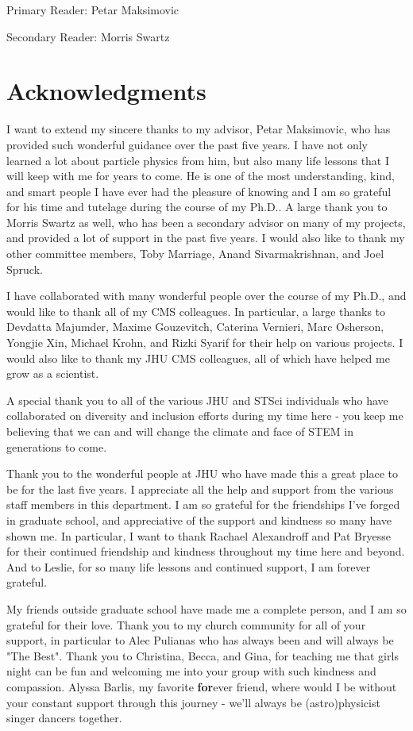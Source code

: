 \documentclass[12pt]{report}
\begin{document}
\vspace{15mm}

\noindent Primary Reader: Petar Maksimovic

\noindent Secondary Reader: Morris Swartz

\chapter*{Acknowledgments}
I want to extend my sincere thanks to my advisor, Petar Maksimovic, who has provided such wonderful guidance over the past five years. I have not only learned a lot about particle physics from him, but also many life lessons that I will keep with me for years to come. He is one of the most understanding, kind, and smart people I have ever had the pleasure of knowing and I am so grateful for his time and tutelage during the course of my Ph.D.. A large thank you to Morris Swartz as well, who has been a secondary advisor on many of my projects, and provided a lot of support in the past five years. I would also like to thank my other committee members, Toby Marriage, Anand Sivarmakrishnan, and Joel Spruck.

I have collaborated with many wonderful people over the course of my Ph.D., and would like to thank all of my CMS colleagues. In particular, a large thanks to Devdatta Majumder, Maxime Gouzevitch, Caterina Vernieri, Marc Osherson, Yongjie Xin, Michael Krohn, and Rizki Syarif for their help on various projects. I would also like to thank my JHU CMS colleagues, all of which have helped me grow as a scientist.

A special thank you to all of the various JHU and STSci individuals who have collaborated on diversity and inclusion efforts during my time here - you keep me believing that we can and will change the climate and face of STEM in generations to come.

Thank you to the wonderful people at JHU who have made this a great place to be for the last five years. I appreciate all the help and support from the various staff members in this department. I am so grateful for the friendships I've forged in graduate school, and appreciative of the support and kindness so many have shown me. In particular, I want to thank Rachael Alexandroff and Pat Bryesse for their continued friendship and kindness throughout my time here and beyond. And to Leslie, for so many life lessons and continued support, I am forever grateful.

My friends outside graduate school have made me a complete person, and I am so grateful for their love. Thank you to my church community for all of your support, in particular to Alec Pulianas who has always been and will always be "The Best". Thank you to Christina, Becca, and Gina, for teaching me that girls night can be fun and welcoming me into your group with such kindness and compassion. Alyssa Barlis, my favorite \textbf{for}ever friend, where would I be without your constant support through this journey - we'll always be (astro)physicist singer dancers together. 
\end{document}

